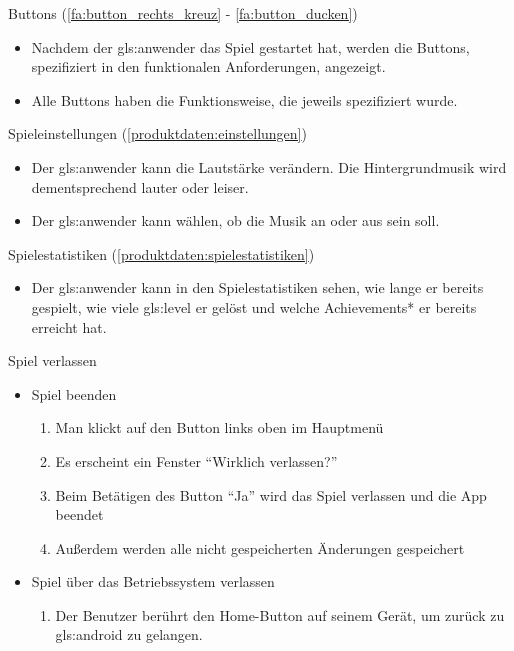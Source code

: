 \documentclass{scrartcl}
\begin{document}
\begin{telist}
	\item Buttons (\ref{fa:button_rechts_kreuz} - \ref{fa:button_ducken})
	\begin{itemize}
		\item Nachdem der \gls{gls:anwender} das Spiel gestartet hat, werden die Buttons, spezifiziert in den funktionalen Anforderungen, angezeigt.
		\item Alle Buttons haben die Funktionsweise, die jeweils spezifiziert wurde.
	\end{itemize}
	
	\item Spieleinstellungen (\ref{produktdaten:einstellungen})
	\begin{itemize}
		\item Der \gls{gls:anwender} kann die Lautstärke verändern. Die Hintergrundmusik wird dementsprechend lauter oder leiser.
		\item Der \gls{gls:anwender} kann wählen, ob die Musik an oder aus sein soll.
	\end{itemize}
	
	\item Spielestatistiken (\ref{produktdaten:spielestatistiken})
	\begin{itemize}
		\item Der \gls{gls:anwender} kann in den Spielestatistiken sehen, wie lange er bereits gespielt, wie viele \gls{gls:level} er gelöst und welche Achievements* er bereits erreicht hat.
	\end{itemize}
	
	\item{Spiel verlassen} \label{szenarien:quit_game}
	\begin{itemize}
		\item Spiel beenden
		\begin{enumerate}
			\item Man klickt auf den Button links oben im Hauptmenü
			\item Es erscheint ein Fenster \enquote{Wirklich verlassen?}
			\item Beim Betätigen des Button \enquote{Ja} wird das Spiel verlassen und die App beendet
			\item Außerdem werden alle nicht gespeicherten Änderungen gespeichert
		\end{enumerate}
		\item Spiel über das Betriebssystem verlassen
		\begin{enumerate}
			\item Der Benutzer berührt den Home-Button auf seinem Gerät, um zurück zu \gls{gls:android} zu gelangen.
		\end{enumerate}
	\end{itemize}
	

\end{telist}
\end{document}
